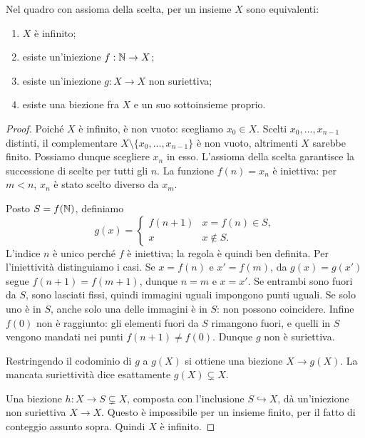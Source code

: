 \begin{teorema}\label{teo:infiniti}
Nel quadro con assioma della scelta, per un insieme $X$ sono equivalenti:
\begin{enumerate}[label=\arabic*.]
\item $X$ è infinito;
\item esiste un'iniezione $f:\mathbb{N}\to X$;
\item esiste un'iniezione $g:X\to X$ non suriettiva;
\item esiste una biezione fra $X$ e un suo sottoinsieme proprio.
\end{enumerate}
\end{teorema}
\begin{proof}
 Poiché $X$ è infinito, è non vuoto: scegliamo $x_0\in X$. Scelti $x_0,\ldots,x_{n-1}$ distinti, il complementare $X\setminus\{x_0,\ldots,x_{n-1}\}$ è non vuoto, altrimenti $X$ sarebbe finito. Possiamo dunque scegliere $x_n$ in esso. L'assioma della scelta garantisce la successione di scelte per tutti gli $n$. La funzione $f(n)=x_n$ è iniettiva: per $m<n$, $x_n$ è stato scelto diverso da $x_m$.

 Posto $S=f(\mathbb{N})$, definiamo
\[
g(x)=\begin{cases}f(n+1)&x=f(n)\in S,\\x&x\notin S.\end{cases}
\]
L'indice $n$ è unico perché $f$ è iniettiva; la regola è quindi ben definita. Per l'iniettività distinguiamo i casi. Se $x=f(n)$ e $x'=f(m)$, da $g(x)=g(x')$ segue $f(n+1)=f(m+1)$, dunque $n=m$ e $x=x'$. Se entrambi sono fuori da $S$, sono lasciati fissi, quindi immagini uguali impongono punti uguali. Se solo uno è in $S$, anche solo una delle immagini è in $S$: non possono coincidere. Infine $f(0)$ non è raggiunto: gli elementi fuori da $S$ rimangono fuori, e quelli in $S$ vengono mandati nei punti $f(n+1)\ne f(0)$. Dunque $g$ non è suriettiva.

 Restringendo il codominio di $g$ a $g(X)$ si ottiene una biezione $X\to g(X)$. La mancata suriettività dice esattamente $g(X)\subsetneq X$.

 Una biezione $h:X\to S\subsetneq X$, composta con l'inclusione $S\hookrightarrow X$, dà un'iniezione non suriettiva $X\to X$. Questo è impossibile per un insieme finito, per il fatto di conteggio assunto sopra. Quindi $X$ è infinito.
\end{proof}

